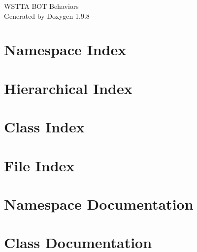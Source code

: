 \documentclass[twoside]{book}
\newcommand{\+}{\discretionary{\mbox{\scriptsize$\hookleftarrow$}}{}{}}
\newcommand{\clearemptydoublepage}{%
    \newpage{\pagestyle{empty}\cleardoublepage}%
  }
\begin{document}
  \raggedbottom
    \hypersetup{pageanchor=false,
                bookmarksnumbered=true,
                pdfencoding=unicode
               }
  \begin{titlepage}
  \vspace*{7cm}
  \begin{center}%
  {\Large WSTTA BOT Behaviors}\\
  \vspace*{1cm}
  {\large Generated by Doxygen 1.9.8}\\
  \end{center}
  \end{titlepage}
  \clearemptydoublepage
  \tableofcontents
  \clearemptydoublepage
  \hypersetup{pageanchor=true}
\chapter{Namespace Index}

\chapter{Hierarchical Index}

\chapter{Class Index}

\chapter{File Index}

\chapter{Namespace Documentation}

\chapter{Class Documentation}
















\end{document}
